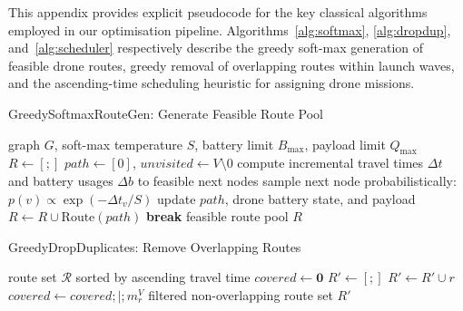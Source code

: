 \label{app:algorithms}

This appendix provides explicit pseudocode for the key classical algorithms employed in our optimisation pipeline. Algorithms~\ref{alg:softmax}, \ref{alg:dropdup}, and~\ref{alg:scheduler} respectively describe the greedy soft-max generation of feasible drone routes, greedy removal of overlapping routes within launch waves, and the ascending-time scheduling heuristic for assigning drone missions.

\vspace{10pt}

\begin{algorithm}[H]
\caption{GreedySoftmaxRouteGen: Generate Feasible Route Pool}
\label{alg:softmax}
\begin{algorithmic}[1]
\Require graph $G$, soft-max temperature $S$, battery limit $B_{\max}$, payload limit $Q_{\max}$
\State $R \gets [;]$
\State $path \gets [0]$, $\textit{unvisited}\gets V\setminus{0}$
\State compute incremental travel times $\Delta t$ and battery usages $\Delta b$ to feasible next nodes
\State sample next node probabilistically: $p(v) \propto \exp(-\Delta t_v/S)$
\State update $path$, drone battery state, and payload
\EndWhile
{} 
\State $R \gets R \cup {\text{Route}(path)}$
\EndIf
{} \textbf{break}
\EndFor
\State \Return feasible route pool $R$
\end{algorithmic}
\end{algorithm}

\vspace{10pt}

\begin{algorithm}[H]
\caption{GreedyDropDuplicates: Remove Overlapping Routes}
\label{alg:dropdup}
\begin{algorithmic}[1]
\Require route set $\mathcal{R}$ sorted by ascending travel time
\State $covered \gets \mathbf{0}$ 
\State $R' \gets [;]$
\State $R' \gets R' \cup {r}$
\State $covered \gets covered ;|; m^V_r$
\EndIf
\EndFor
\State \Return filtered non-overlapping route set $R'$
\end{algorithmic}
\end{algorithm}

\vspace{10pt}

